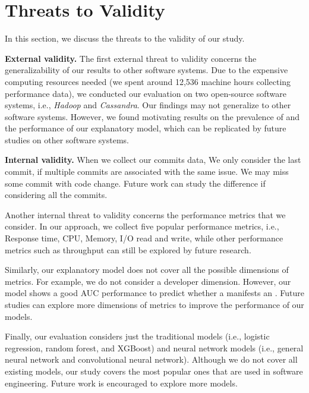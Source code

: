 
\section{Threats to Validity}
\label{sec:threats}
In this section, we discuss the threats to the validity of our study. 

\noindent \textbf{External validity.} The first external threat to validity concerns the generalizability of our results to other software systems. Due to the expensive computing resources needed (we spent around 12,536 machine hours collecting performance data), we conducted our evaluation on two open-source software systems, i.e., \emph{Hadoop} and \emph{Cassandra}. Our findings may not generalize to other software systems. %
However, we found motivating results on the prevalence of \inconsistent and the performance of our explanatory model, which can be replicated by future studies on other software systems. %

\noindent \textbf{Internal validity.}
When we collect our commits data, We only consider the last commit, if multiple commits are associated with the same issue. We may miss some commit with code change. Future work can study the difference if considering all the commits.

Another internal threat to validity concerns the performance metrics that we consider. In our approach, we collect five popular performance metrics, i.e., Response time, CPU, Memory, I/O read and write, while other performance metrics such as throughput can still be explored by future research.%


Similarly, our explanatory model does not cover all the possible dimensions of metrics. For example, we do not consider a developer dimension. However, our model shows a good AUC performance to predict whether a \instance manifests an \inconsistent. Future studies can explore more dimensions of metrics to improve the performance of our models. 

Finally, our evaluation considers just the traditional models (i.e., logistic regression, random forest, and XGBoost) and neural network models (i.e., general neural network and convolutional neural network). Although we do not cover all existing models, our study covers the most popular ones that are used in software engineering. Future work is encouraged to explore more models. 


